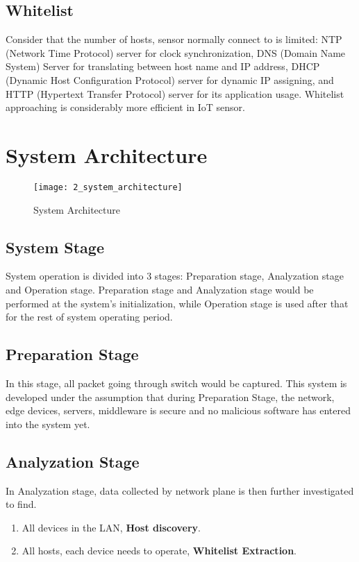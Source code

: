 \subsection{Whitelist}
Consider that the number of hosts, sensor normally connect to is limited: NTP (Network Time Protocol) server for clock synchronization, DNS (Domain Name System) Server for translating between host name and IP address, DHCP (Dynamic Host Configuration Protocol) server for dynamic IP assigning, and HTTP (Hypertext Transfer Protocol) server for its application usage. Whitelist approaching is considerably more efficient in IoT sensor.

\section{System Architecture}
\begin{figure}[h]
    \centering 
    \texttt{[image: 2\_system\_architecture]}
    \caption{System Architecture }
    \label{fig:s3_system_architecture}
\end{figure}

\subsection{System Stage}
System operation is divided into 3 stages: Preparation stage, Analyzation stage and Operation stage. Preparation stage and Analyzation stage would be performed at the system’s initialization, while Operation stage is used after that for the rest of system operating period.  

\subsection{Preparation Stage}
In this stage, all packet going through switch would be captured. This system is developed under the assumption that during Preparation Stage, the network, edge devices, servers, middleware is secure and no malicious software has entered into the system yet.

\subsection{Analyzation Stage}
In Analyzation stage, data collected by network plane is then further investigated to find.  
\begin{enumerate}
    \item All devices in the LAN, \textbf{Host discovery}.
    \item All hosts, each device needs to operate, \textbf{Whitelist Extraction}. 
\end{enumerate}

